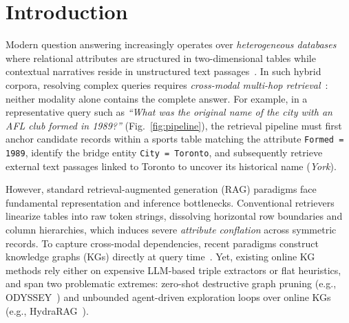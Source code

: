 \documentclass[runningheads]{llncs}
\begin{document}
\section{Introduction}
Modern question answering increasingly operates over \emph{heterogeneous databases} where relational attributes are structured in two-dimensional tables while contextual narratives reside in unstructured text passages~\cite{zhou2026tableqasurvey}. In such hybrid corpora, resolving complex queries requires \emph{cross-modal multi-hop retrieval}~\cite{hybridqa}: neither modality alone contains the complete answer. For example, in a representative query such as \emph{``What was the original name of the city with an AFL club formed in 1989?''} (Fig.~\ref{fig:pipeline}), the retrieval pipeline must first anchor candidate records within a sports table matching the attribute \texttt{Formed = 1989}, identify the bridge entity \texttt{City = Toronto}, and subsequently retrieve external text passages linked to Toronto to uncover its historical name (\emph{York}).

However, standard retrieval-augmented generation (RAG) paradigms face fundamental representation and inference bottlenecks. Conventional retrievers linearize tables into raw token strings, dissolving horizontal row boundaries and column hierarchies, which induces severe \emph{attribute conflation} across symmetric records. To capture cross-modal dependencies, recent paradigms construct knowledge graphs (KGs) directly at query time~\cite{agarwal2025hybrid,peng2024graphragsurvey}. Yet, existing online KG methods rely either on expensive LLM-based triple extractors or flat heuristics, and span two problematic extremes: zero-shot destructive graph pruning (e.g., ODYSSEY~\cite{agarwal2025hybrid}) and unbounded agent-driven exploration loops over online KGs (e.g., HydraRAG~\cite{tan2025hydrarag}).
\end{document}
